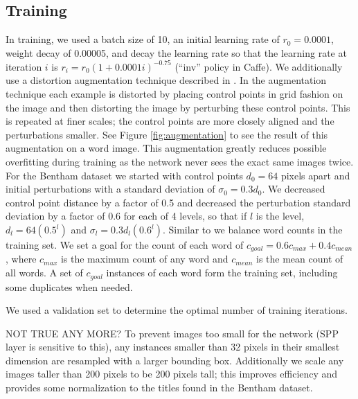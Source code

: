 \documentclass[ms,electronic,twosidetoc,letterpaper,chaptercenter,parttop,lol,lof,lot]{byumsphd}
\begin{document}
\subsection{Training}

In training, we used a batch size of 10, an initial learning rate of $r_0=0.0001$, weight decay of 0.00005, and decay the learning rate so that the learning rate at iteration $i$ is $r_i = r_0 (1 + 0.0001 i)^{-0.75}$ (``inv'' policy in Caffe). We additionally use a distortion augmentation technique described in \cite{wigington2017}. In the augmentation technique each example is distorted by placing control points in grid fashion on the image and then distorting the image by perturbing these control points. This is repeated at finer scales; the control points are more closely aligned and the perturbations smaller. See Figure \ref{fig:augmentation} to see the result of this augmentation on a word image. This augmentation greatly reduces possible overfitting during training as the network never sees the exact same images twice.
For the Bentham dataset we started with control points $d_0 = 64$ pixels apart and initial perturbations with a standard deviation of $\sigma_0 = 0.3 d_0$. We decreased control point distance by a factor of 0.5 and decreased the perturbation standard deviation by a factor of 0.6 for each of 4 levels, so that if $l$ is the level, $d_l = 64(0.5^{l})$ and $\sigma_l = 0.3 d_l (0.6^{l})$.
Similar to \citep{sudholt2016} we balance word counts in the training set. We set a goal for the count of each word of $c_{goal} = 0.6c_{max}+0.4c_{mean}$, where $c_{max}$ is the maximum count of any word and $c_{mean}$ is the mean count of all words. A set of $c_{goal}$ instances of each word form the training set, including some duplicates when needed.

We used a validation set to determine the optimal number of training iterations.

NOT TRUE ANY MORE?
To prevent images too small for the network (SPP layer is sensitive to this), any instances smaller than 32 pixels in their smallest dimension are resampled with a larger bounding box. Additionally we scale any images taller than 200 pixels to be 200 pixels tall; this improves efficiency and provides some normalization to the titles found in the Bentham dataset.
\end{document}
